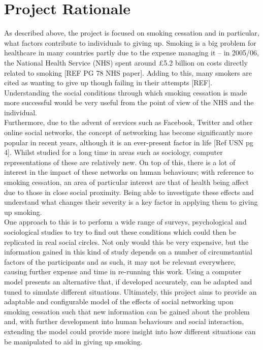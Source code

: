 \documentclass[]{report}
\begin{document}
\section{Project Rationale}
As described above, the project is focused on smoking cessation and in particular, what factors contribute to individuals to giving up. Smoking is a big problem for healthcare in many countries partly due to the expense managing it – in 2005/06, the National Health Service (NHS) spent around £5.2 billion on costs directly related to smoking [REF PG 78 NHS paper]. Adding to this, many smokers are cited as wanting to give up though failing in their attempts [REF]. Understanding the social conditions through which smoking cessation is made more successful would be very useful from the point of view of the NHS and the individual. \\
Furthermore, due to the advent of services such as Facebook, Twitter and other online social networks, the concept of networking has become significantly more popular in recent years, although it is an ever-present factor in life [Ref USN pg 4]. Whilst studied for a long time in areas such as sociology, computer representations of these are relatively new. On top of this, there is a lot of interest in the impact of these networks on human behaviours; with reference to smoking cessation, an area of particular interest are that of health being affect due to those in close social proximity. Being able to investigate these effects and understand what changes their severity is a key factor in applying them to giving up smoking.\\
One approach to this is to perform a wide range of surveys, psychological and sociological studies to try to find out these conditions which could then be replicated in real social circles. Not only would this be very expensive, but the information gained in this kind of study depends on a number of circumstantial factors of the participants and as such, it may not be relevant everywhere, causing further expense and time in re-running this work. Using a computer model presents an alternative that, if developed accurately, can be adapted and tuned to simulate different situations. Ultimately, this project aims to provide an adaptable and configurable model of the effects of social networking upon smoking cessation such that new information can be gained about the problem and, with further development into human behaviours and social interaction, extending the model could provide more insight into how different situations can be manipulated to aid in giving up smoking.\\
\end{document}
